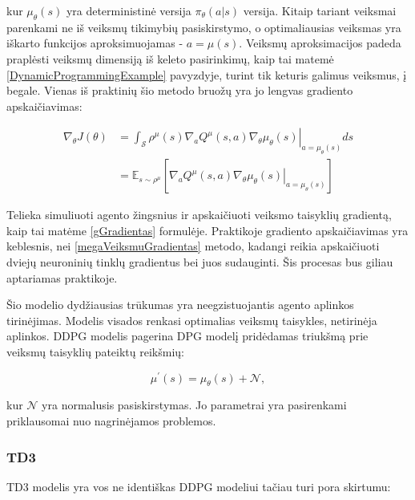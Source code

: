 \documentclass[a4paper, 12pt]{article}
\begin{document}
kur $\mu_{\theta}(s)$ yra deterministinė versija $\pi_\theta(a|s)$ versija. Kitaip tariant veiksmai parenkami ne iš veiksmų tikimybių pasiskirstymo, o optimaliausias veiksmas yra iškarto funkcijos aproksimuojamas - $a = \mu(s)$. Veiksmų aproksimacijos padeda praplėsti veiksmų dimensiją iš keleto pasirinkimų, kaip tai matemė \ref{DynamicProgrammingExample} pavyzdyje, turint tik keturis galimus veiksmus, į begale. Vienas iš praktinių šio metodo bruožų yra jo lengvas gradiento apskaičiavimas:

\begin{equation}
\begin{aligned}
\nabla_{\theta} J(\theta) &=\left.\int_{\mathcal{S}} \rho^{\mu}(s) \nabla_{a} Q^{\mu}(s, a) \nabla_{\theta} \mu_{\theta}(s)\right|_{a=\mu_{\theta}(s)} d s \\
&=\mathbb{E}_{s \sim \rho^{\mu}}\left[\left.\nabla_{a} Q^{\mu}(s, a) \nabla_{\theta} \mu_{\theta}(s)\right|_{a=\mu_{\theta}(s)}\right]
\end{aligned}
\end{equation}

Telieka simuliuoti agento žingsnius ir apskaičiuoti veiksmo taisyklių gradientą, kaip tai matėme \ref{gGradientas} formulėje. Praktikoje gradiento apskaičiavimas yra keblesnis, nei \ref{megaVeiksmuGradientas} metodo, kadangi reikia apskaičiuoti dviejų neuroninių tinklų gradientus bei juos sudauginti. Šis procesas bus giliau aptariamas praktikoje. 

Šio modelio dydžiausias trūkumas yra neegzistuojantis agento aplinkos tirinėjimas. Modelis visados renkasi optimalias veiksmų taisykles, netirinėja aplinkos. DDPG\cite{DDPG} modelis pagerina DPG modelį pridėdamas triukšmą prie veiksmų taisyklių pateiktų reikšmių:

\begin{equation}
\mu^{\prime}(s)=\mu_{\theta}(s)+\mathcal{N},
\end{equation}

kur $\mathcal{N}$ yra normalusis pasiskirstymas. Jo parametrai yra pasirenkami priklausomai nuo nagrinėjamos problemos. 

\subsubsection{TD3}

TD3 modelis yra vos ne identiškas DDPG modeliui tačiau turi pora skirtumu:
\end{document}
